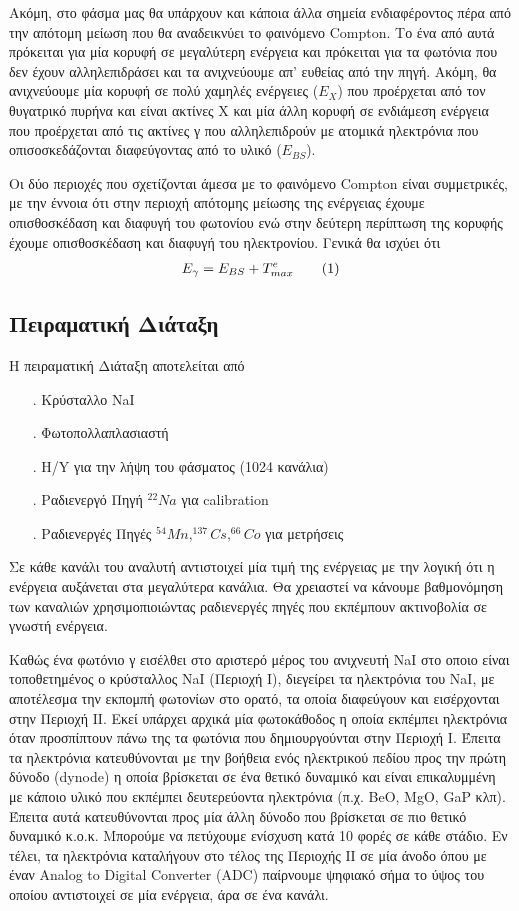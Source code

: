 \documentclass[a4paper]{article}
\newcommand\numberthis{\addtocounter{equation}{1}\tag{\theequation}}
\begin{document}
	Ακόμη, στο φάσμα μας θα υπάρχουν και κάποια άλλα σημεία ενδιαφέροντος πέρα από την απότομη μείωση που θα αναδεικνύει το φαινόμενο Compton. 
	Το ένα από αυτά πρόκειται για μία κορυφή σε  μεγαλύτερη ενέργεια και πρόκειται για τα φωτόνια που δεν έχουν αλληλεπιδράσει και τα ανιχνεύουμε απ' ευθείας από την πηγή.
	Ακόμη, θα ανιχνεύουμε μία κορυφή σε πολύ χαμηλές ενέργειες ($E_X$) που προέρχεται από τον θυγατρικό πυρήνα και είναι ακτίνες Χ και μία άλλη κορυφή σε ενδιάμεση ενέργεια που προέρχεται από τις ακτίνες γ που αλληλεπιδρούν με ατομικά ηλεκτρόνια που οπισοσκεδάζονται διαφεύγοντας από το υλικό ($E_{BS}$). 
	
	Οι δύο περιοχές που σχετίζονται άμεσα με το φαινόμενο Compton είναι συμμετρικές, με την έννοια ότι στην περιοχή απότομης μείωσης της ενέργειας έχουμε οπισθοσκέδαση και διαφυγή του φωτονίου ενώ στην δεύτερη περίπτωση της κορυφής έχουμε οπισθοσκέδαση και διαφυγή του ηλεκτρονίου.
	Γενικά θα ισχύει ότι  
		\begin{align*}\label{eq9}
			E_\gamma = E_{BS} + T^e_{max} \numberthis
		\end{align*}
		
\subsection*{Πειραματική Διάταξη}
	Η πειραματική Διάταξη αποτελείται από 
		\begin{itemize}
			\item[.]  Κρύσταλλο NaI 
			\item[.]  Φωτοπολλαπλασιαστή 
			\item[.]  H/Y για την λήψη του φάσματος (1024 κανάλια)
			\item[.]  Ραδιενεργό Πηγή $^{22}Na$ για calibration
			\item[.]  Ραδιενεργές Πηγές $^{54}Mn, ^{137}Cs, ^{66}Co $ για μετρήσεις
		\end{itemize}
		
		Σε κάθε κανάλι του αναλυτή αντιστοιχεί μία τιμή της ενέργειας με την λογική ότι η ενέργεια αυξάνεται στα μεγαλύτερα κανάλια. Θα χρειαστεί να κάνουμε βαθμονόμηση των καναλιών χρησιμοπιοιώντας ραδιενεργές πηγές που εκπέμπουν ακτινοβολία σε γνωστή ενέργεια.
		
		Καθώς ένα φωτόνιο γ εισέλθει στο αριστερό μέρος του ανιχνευτή NaI στο οποιο είναι τοποθετημένος ο κρύσταλλος NaI (Περιοχή Ι), διεγείρει τα ηλεκτρόνια του NaI, με αποτέλεσμα την εκπομπή φωτονίων στο ορατό, τα οποία διαφεύγουν και εισέρχονται στην Περιοχή ΙΙ. Εκεί υπάρχει αρχικά μία φωτοκάθοδος η οποία εκπέμπει ηλεκτρόνια όταν προσπίπτουν πάνω της τα φωτόνια που δημιουργούνται στην Περιοχή Ι. Έπειτα τα ηλεκτρόνια κατευθύνονται με την βοήθεια ενός ηλεκτρικού πεδίου προς την πρώτη δύνοδο (dynode) η οποία βρίσκεται σε ένα θετικό δυναμικό και είναι επικαλυμμένη με κάποιο υλικό που εκπέμπει δευτερεύοντα ηλεκτρόνια (π.χ. BeO, MgO, GaP κλπ). Έπειτα αυτά κατευθύνονται προς μία άλλη δύνοδο που βρίσκεται σε πιο θετικό δυναμικό κ.ο.κ. Μπορούμε να πετύχουμε ενίσχυση κατά 10 φορές σε κάθε στάδιο. Εν τέλει, τα ηλεκτρόνια καταλήγουν στο τέλος της Περιοχής ΙΙ σε μία άνοδο όπου με έναν Analog to Digital Converter (ADC) παίρνουμε ψηφιακό σήμα το ύψος του οποίου αντιστοιχεί σε μία ενέργεια, άρα σε ένα κανάλι.
	
\end{document}
